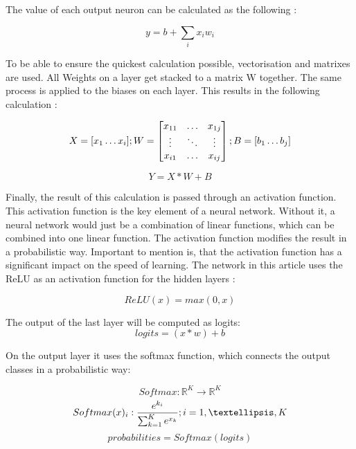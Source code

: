 The value of each output neuron can be calculated as the following \cite{medium_nn_from_scratch}:

\begin{equation}
y = b + \sum_{i} x_i w_i
\end{equation}

To be able to ensure the quickest calculation possible, vectorisation and matrixes are used.
All Weights on a layer get stacked to a matrix W together.
The same process is applied to the biases on each layer.
This results in the following calculation
\cite{medium_nn_from_scratch}:

\begin{equation}
X = [ x_1 \dots x_i ]; \space W = 
\begin{bmatrix}
    x_{11} & \dots  & x_{1j} \\
    \vdots & \ddots & \vdots \\
    x_{i1} & \dots  & x_{ij}
\end{bmatrix}; \space
B = [ b_1 \dots b_j ]
\end{equation}

\begin{equation}
    Y = X * W + B
\end{equation}

Finally, the result of this calculation is passed through an activation function.
This activation function is the key element of a neural network.
Without it, a neural network would just be a combination of linear functions, which can be combined into one linear function.
The activation function modifies the result in a probabilistic way.
Important to mention is, that the activation function has a significant impact on the speed of learning.
The network in this article uses the ReLU as an activation function for the hidden layers \cite{math_nn_skalski,relu}:

\begin{equation}
    ReLU(x) = max(0,x)
\end{equation}

The output of the last layer will be computed as logits:
$$logits = (x*w)+b$$

On the output layer it uses the softmax function, which connects the output classes in a probabilistic way:

\begin{equation}
    Softmax : \mathbb{R}^K \to \mathbb{R}^K
\end{equation}
\begin{equation}
    Softmax(x)_i : \frac{e^{k_i}}{\sum_{k=1}^K e^{x_k}}
\space ; i = 1, …, K
\end{equation}
\begin{equation}
    probabilities = Softmax(logits)
\end{equation}

